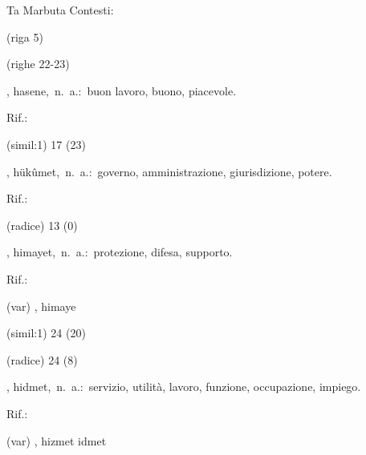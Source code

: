 \begin{glossario}{Ta Marbuta}
Contesti:
\begin{subvocedue}
\item[(riga 5)] 
\item[(righe 22-23)] 
\end{subvocedue}
\item[{\color{colorlowref}\spzrl{.hasin.H}},] {\sf hasene},\ n.\ a.:\ buon  lavoro,   buono,  piacevole.
\begin{subvocedue}
\item[Rif.:] 
\end{subvocedue}
\begin{subvocedue}
\item[(simil:1)]   17 (23)
\end{subvocedue}
\item[{\color{colorlowref}\spzrl{.hukUmat}},] {\sf hükûmet},\ n.\ a.:\ governo, amministrazione, giurisdizione, potere.
\begin{subvocedue}
\item[Rif.:] 
\end{subvocedue}
\begin{subvocedue}
\item[(radice)]   13 (0)
\end{subvocedue}
\item[{\color{colorlowref}\spzrl{.himAyat}},] {\sf himayet},\ n.\ a.:\ protezione, difesa, supporto.
\begin{subvocedue}
\item[Rif.:] 
\end{subvocedue}
\begin{subvocedue}
\item[(var)] , {\sf himaye}\item[(simil:1)]   24 (20)
\item[(radice)]   24 (8)
\end{subvocedue}
\item[{\color{colorlowref}\spzrl{_hidmat}},] {\sf hidmet},\ n.\ a.:\ servizio,  utilità,  lavoro, funzione, occupazione, impiego.
\begin{subvocedue}
\item[Rif.:] 
\end{subvocedue}
\begin{subvocedue}
\item[(var)] , {\sf hizmet \textchi idmet}\begin{subvocedue}

\end{subvocedue}
\end{subvocedue}
\end{glossario}
